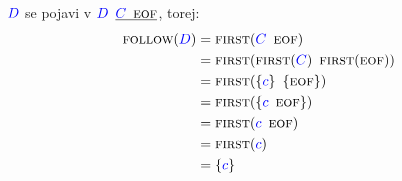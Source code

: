 \documentclass{article}
\newcommand{\Ex}{\textbf{Npr.:}\ }
\newcommand{\FIRST}{\textsc{first}}
\newcommand{\FOLLOW}{\textsc{follow}}
\newcommand{\EOF}{\textsc{eof}}
\newcommand{\Symbol}[1]{\textcolor{blue}{#1}}
\newcommand{\Grammar}{G}
\newcommand{\Null}{\varepsilon}
\newcommand{\Arrow}{\Coloneq}
\newcommand{\Seq}{{\ \,}}
\newcommand{\Union}{\mathrel{|}}
\begin{document}
$\Symbol{D}$ se pojavi v $\Symbol{D} \Seq \underline{\Symbol{C} \Seq \EOF}$, torej:
\begin{align*}
  \FOLLOW(\Symbol{D}) &= \FIRST(\Symbol{C} \Seq \EOF) \\
             &= \FIRST(\FIRST(\Symbol{C}) \Seq \FIRST(\EOF))\\
             &= \FIRST(\{\Symbol{c}\} \Seq \{\EOF\})\\
             &= \FIRST(\{\Symbol{c} \Seq \EOF\})\\
             &= \FIRST(\Symbol{c} \Seq \EOF) \\
             &= \FIRST(\Symbol{c})\\
             &= \{\Symbol{c}\}
\end{align*}


%
%
%
%
\end{document}
